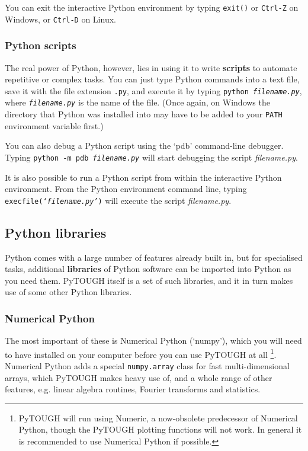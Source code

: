 You can exit the interactive Python environment by typing \texttt{exit()} or \texttt{Ctrl-Z} on Windows, or \texttt{Ctrl-D} on Linux.

\subsubsection{Python scripts}

The real power of Python, however, lies in using it to write \textbf{scripts} to automate repetitive or complex tasks.  You can just type Python commands into a text file, save it with the file extension \texttt{.py}, and execute it by typing \texttt{python \emph{filename.py}}, where \texttt{\emph{filename.py}} is the name of the file.  (Once again, on Windows the directory that Python was installed into may have to be added to your \texttt{PATH} environment variable first.)

You can also debug a Python script using the `pdb' command-line debugger.  Typing \texttt{python -m pdb \emph{filename.py}} will start debugging the script \emph{filename.py}.

It is also possible to run a Python script from within the interactive Python environment.  From the Python environment command line, typing \texttt{execfile(\emph{`filename.py'})} will execute the script \emph{filename.py}.

\subsection{Python libraries}
\label{pylibraries}

Python comes with a large number of features already built in, but for specialised tasks, additional \textbf{libraries} of Python software can be imported into Python as you need them.  PyTOUGH itself is a set of such libraries, and it in turn makes use of some other Python libraries.

\subsubsection{Numerical Python}

The most important of these is Numerical Python (`numpy'), which you will need to have installed on your computer before you can use PyTOUGH at all \footnote{PyTOUGH will run using Numeric, a now-obsolete predecessor of Numerical Python, though the PyTOUGH plotting functions will not work.  In general it is recommended to use Numerical Python if possible.}.  Numerical Python adds a special \texttt{numpy.array} class for fast multi-dimensional arrays, which PyTOUGH makes heavy use of, and a whole range of other features, e.g. linear algebra routines, Fourier transforms and statistics.

